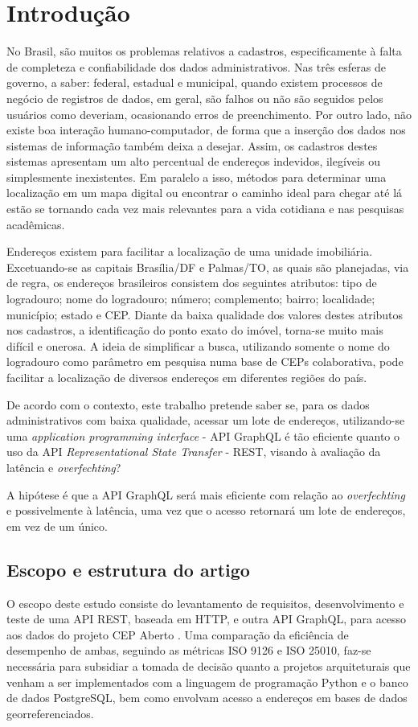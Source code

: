 \documentclass[conference]{IEEEtran}
\begin{document}
\section{Introdução}
\label{sec:introducao}

No Brasil, são muitos os problemas relativos a cadastros, especificamente à falta de completeza e confiabilidade dos dados administrativos. Nas três esferas de governo, a saber: federal, estadual e municipal, quando existem processos de negócio de registros de dados, em geral, são falhos ou não são seguidos pelos usuários como deveriam, ocasionando erros de preenchimento. Por outro lado, não existe boa interação humano-computador, de forma que a inserção dos dados nos sistemas de informação também deixa a desejar. Assim, os cadastros destes sistemas apresentam um alto percentual de endereços indevidos, ilegíveis ou simplesmente inexistentes. Em paralelo a isso, métodos para determinar uma localização em um mapa digital ou encontrar o caminho ideal para chegar até lá estão se tornando cada vez mais relevantes para a vida cotidiana e nas pesquisas acadêmicas.
		
Endereços existem para facilitar a localização de uma unidade imobiliária. Excetuando-se as capitais Brasília/DF e Palmas/TO, as quais são planejadas, via de regra, os endereços brasileiros consistem dos seguintes atributos: tipo de logradouro; nome do logradouro; número; complemento; bairro; localidade; município; estado e CEP. Diante da baixa qualidade dos valores destes atributos nos cadastros, a identificação do ponto exato do imóvel, torna-se muito mais difícil e onerosa. A ideia de simplificar a busca, utilizando somente o nome do logradouro como parâmetro em pesquisa numa base de CEPs colaborativa, pode facilitar a localização de diversos endereços em diferentes regiões do país.
	
De acordo com o contexto, este trabalho pretende saber se, para os dados administrativos com baixa qualidade, acessar um lote de endereços, utilizando-se uma  \textit{application programming interface} - API GraphQL é tão eficiente quanto o uso da API \textit{Representational State Transfer} - REST, visando à avaliação da latência e \textit{overfechting}?

A hipótese é que a API GraphQL será mais eficiente com relação ao \textit{overfechting} e possivelmente à latência, uma vez que o acesso retornará um lote de endereços, em vez de um único. 

\subsection{Escopo e estrutura do artigo}
O escopo deste estudo consiste do levantamento de requisitos, desenvolvimento e teste de uma API REST, baseada em HTTP, e outra API GraphQL, para acesso aos dados do projeto CEP Aberto \cite{CEPAberto:2019}. Uma comparação da eficiência de desempenho de ambas, seguindo as métricas ISO 9126 e ISO 25010, faz-se necessária para subsidiar a tomada de decisão quanto a projetos arquiteturais que venham a ser implementados com a linguagem de programação Python e o banco de dados PostgreSQL, bem como envolvam acesso a endereços em bases de dados georreferenciados.
	
\end{document}
